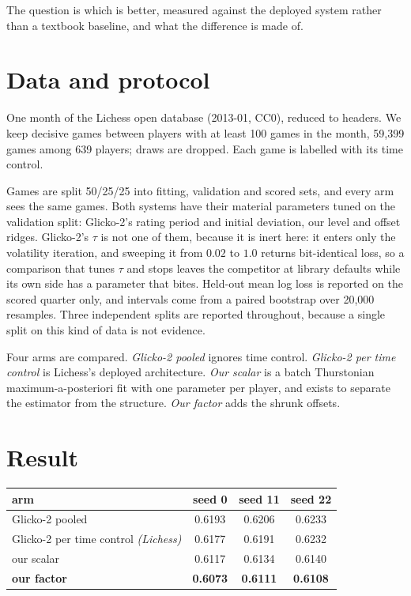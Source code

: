 \documentclass[11pt]{article}
\begin{document}
The question is which is better, measured against the deployed system
rather than a textbook baseline, and what the difference is made of.

\section{Data and protocol}

One month of the Lichess open database (2013-01, CC0), reduced to
headers. We keep decisive games between players with at least 100 games in the
month, 59{,}399 games among 639 players; draws are dropped. Each game is labelled with its
time control.

Games are split 50/25/25 into fitting, validation and scored sets, and
every arm sees the same games. Both systems have their material
parameters tuned on the validation split: Glicko-2's rating period and
initial deviation, our level and offset ridges. Glicko-2's $\tau$ is
not one of them, because it is inert here: it enters only the
volatility iteration, and sweeping it from $0.02$ to $1.0$ returns
bit-identical loss, so a comparison that tunes $\tau$ and stops leaves
the competitor at library defaults while its own side has a parameter
that bites. Held-out mean log loss is reported on the
scored quarter only, and intervals come from a paired bootstrap over
20{,}000 resamples. Three independent splits are reported throughout,
because a single split on this kind of data is not evidence.

Four arms are compared. \emph{Glicko-2 pooled} ignores time control.
\emph{Glicko-2 per time control} is Lichess's deployed architecture.
\emph{Our scalar} is a batch Thurstonian maximum-a-posteriori fit with
one parameter per player, and exists to separate the estimator from the
structure. \emph{Our factor} adds the shrunk offsets.

\section{Result}

\begin{center}
\begin{tabular}{lccc}
\toprule
arm & seed 0 & seed 11 & seed 22 \\
\midrule
Glicko-2 pooled & 0.6193 & 0.6206 & 0.6233 \\
Glicko-2 per time control \emph{(Lichess)} & 0.6177 & 0.6191 & 0.6232 \\
our scalar & 0.6117 & 0.6134 & 0.6140 \\
\textbf{our factor} & \textbf{0.6073} & \textbf{0.6111} & \textbf{0.6108} \\
\bottomrule
\end{tabular}
\end{center}
\end{document}
